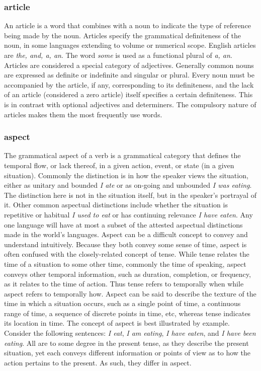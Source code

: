 \begin{small}
\subsubsection{article}
An article is a word that combines with a noun to indicate the type of reference being made by the noun. Articles specify the grammatical definiteness of the noun, in some languages extending to volume or numerical scope. English articles are \emph{the, and, a, an}.  The word \emph{some} is used as a functional plural of \emph{a, an}.  Articles are considered a special category of adjectives.
Generally common nouns are expressed as definite or indefinite and singular or plural. Every noun must be accompanied by the article, if any, corresponding to its definiteness, and the lack of an article (considered a zero article) itself specifies a certain definiteness. This is in contrast with optional adjectives and determiners.  The compulsory nature of articles makes them the most frequently use words.

\subsubsection{aspect}
The grammatical aspect  of a verb is a grammatical category that defines the temporal flow, or lack thereof, in a given action, event, or state (in a given situation). Commonly the distinction is in how the speaker views the situation, either as unitary and bounded \emph{I ate} or as on-going and unbounded \emph{I was eating}. The distinction here is not in the situation itself, but in the speaker's portrayal of it. Other common aspectual distinctions include whether the situation is repetitive or habitual \emph{I used to eat} or has continuing relevance \emph{I have eaten}. Any one language will have at most a subset of the attested aspectual distinctions made in the world's languages.  Aspect can be a difficult concept to convey and understand intuitively. Because they both convey some sense of time, aspect is often confused with the closely-related concept of tense. While tense relates the time of a situation to some other time, commonly the time of speaking, aspect conveys other temporal information, such as duration, completion, or frequency, as it relates to the time of action. Thus tense refers to temporally when while aspect refers to temporally how. Aspect can be said to describe the texture of the time in which a situation occurs, such as a single point of time, a continuous range of time, a sequence of discrete points in time, etc, whereas tense indicates its location in time.  The concept of aspect is best illustrated by example. Consider the following sentences: \emph{I eat}, \emph{I am eating}, \emph{I have eaten}, and \emph{I have been eating}. All are to some degree in the present tense, as they describe the present situation, yet each conveys different information or points of view as to how the action pertains to the present. As such, they differ in aspect.


\end{small}
